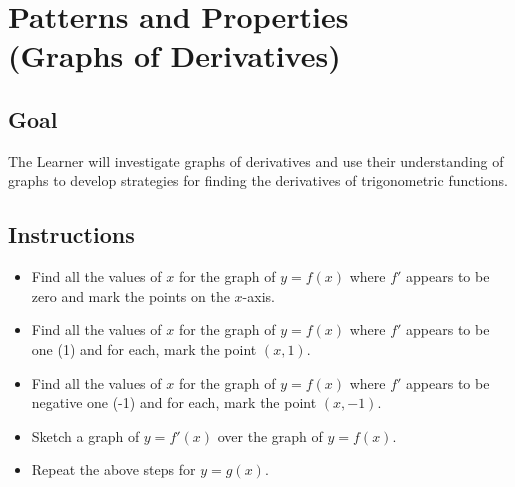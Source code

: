 \section{Patterns and Properties\\ (Graphs of Derivatives)}
\subsection*{Goal}
The Learner will investigate graphs of derivatives and use their understanding
of graphs to develop strategies for finding the derivatives of trigonometric
functions.

\subsection*{Instructions}
\begin{itemize}
\item Find all the values of \(x\) for the graph of \(y=f(x)\) where
\(f'\) appears to be zero and mark the points on the \(x\)-axis.
\item Find all the values of \(x\) for the graph of \(y=f(x)\) where
\(f'\) appears to be one (1) and for each, mark the point \((x,1)\).
\item Find all the values of \(x\) for the graph of \(y=f(x)\) where
\(f'\) appears to be negative one (-1) and for each, mark the point \((x,-1)\).
\item Sketch a graph of \(y=f'(x)\) over the graph of \(y=f(x)\).
\item Repeat the above steps for \(y=g(x)\).
\end{itemize}

